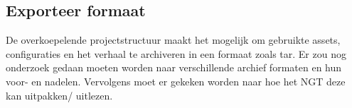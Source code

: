 \subsection{Exporteer formaat}
De overkoepelende projectstructuur maakt het mogelijk om gebruikte assets, configuraties en het verhaal te archiveren in een formaat zoals tar. Er zou nog onderzoek gedaan moeten worden naar verschillende archief formaten en hun voor- en nadelen. Vervolgens moet er gekeken worden naar hoe het NGT deze kan uitpakken/ uitlezen.
